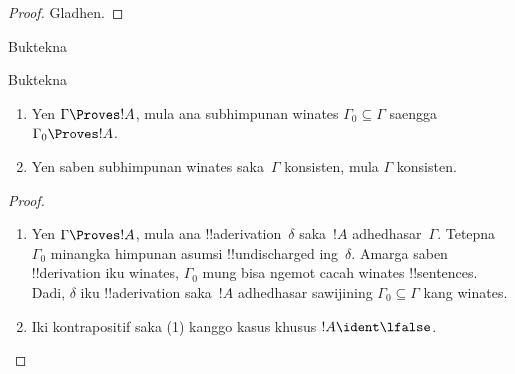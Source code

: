 \documentclass[../../../include/open-logic-section]{subfiles}
\begin{document}
\begin{proof}
Gladhen.
\end{proof}

\begin{prob}
Buktekna 
\end{prob}
\tagendprob

\begin{prob}
Buktekna 
\end{prob}
\tagendprob

\begin{prop}[Kekompakan]
  \begin{enumerate}
  \item Yen $\Gamma \Proves !A$, mula ana subhimpunan winates
    $\Gamma_0 \subseteq \Gamma$ saengga $\Gamma_0 \Proves !A$.
  \item Yen saben subhimpunan winates saka~$\Gamma$ konsisten,
    mula $\Gamma$ konsisten.
  \end{enumerate}
\end{prop}

\begin{proof}
  \begin{enumerate}
    \item Yen $\Gamma \Proves !A$, mula ana
      !!a{derivation}~$\delta$ saka~$!A$ adhedhasar~$\Gamma$. Tetepna
      $\Gamma_0$ minangka himpunan asumsi !!{undischarged} ing~$\delta$.
      Amarga saben !!{derivation} iku winates, $\Gamma_0$ mung bisa
      ngemot cacah winates !!{sentence}s. Dadi, $\delta$ iku
      !!a{derivation} saka~$!A$ adhedhasar sawijining $\Gamma_0
      \subseteq \Gamma$ kang winates.
    \item Iki kontrapositif saka (1) kanggo kasus khusus $!A \ident
      \lfalse$.
  \end{enumerate}
\end{proof}
\end{document}
